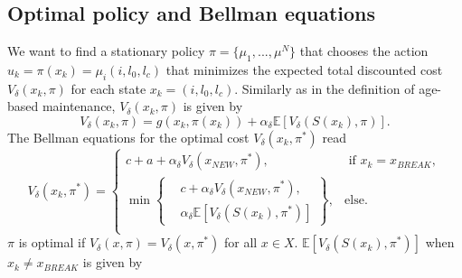 \documentclass[a4paper]{thesis}
\theoremstyle{definition}
\begin{document}
\subsection{Optimal policy and Bellman equations}
We want to find a stationary policy $\pi= \{\mu_1,...,\mu^N\}$ that chooses the action $u_k=\pi(x_k)=\mu_i(i,l_0,l_c)$ that minimizes the expected total discounted cost $V_\delta(x_k,\pi)$ for each state $x_k=(i,l_0,l_c)$.
Similarly as in the definition of age-based maintenance, $V_\delta(x_k,\pi)$ is given by
\[V_\delta(x_k,\pi)=g(x_k,\pi(x_k))+\alpha_\delta \mathbb{E}[V_\delta(S(x_k),\pi)].\]
The Bellman equations for the optimal cost $V_\delta(x_k,\pi^*)$ read
\begin{equation}\label{eq:MmfmBellman}
V_\delta(x_k,\pi^*)=\begin{cases}
c+a+\alpha_\delta V_\delta(x_{NEW},\pi^*),&\text{ if }x_k=x_{BREAK},\\
\min\left\{\begin{split}&c+\alpha_\delta V_\delta(x_{NEW},\pi^*),\\&\alpha_\delta \mathbb{E}[V_\delta(S(x_k),\pi^*)]\end{split}\right\},&\text{else.}\\
\end{cases}
\end{equation}
$\pi$ is optimal if $V_\delta(x,\pi)=V_\delta(x,\pi^*)$ for all $x\in X$.
$\mathbb{E}[V_\delta(S(x_k),\pi^*)]$ when $x_k\neq x_{BREAK}$ is given by 
\end{document}
